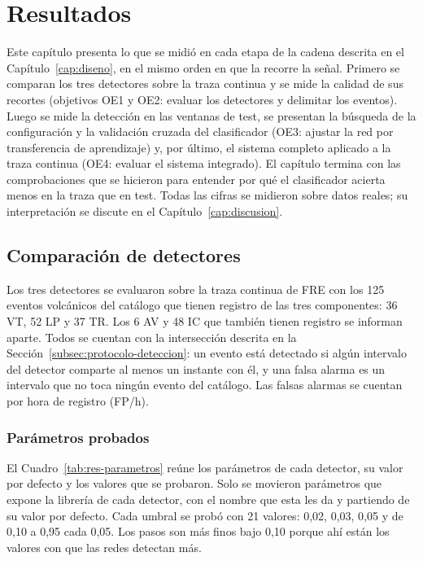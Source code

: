 \chapter{Resultados}
\label{cap:resultados}

Este capítulo presenta lo que se midió en cada etapa de la cadena descrita en
el Capítulo~\ref{cap:diseno}, en el mismo orden en que la recorre la señal.
Primero se comparan los tres detectores sobre la traza continua y se mide la
calidad de sus recortes (objetivos OE1 y OE2: evaluar los detectores y
delimitar los eventos). Luego se mide la detección en las ventanas de test, se
presentan la búsqueda de la configuración y la validación cruzada del
clasificador (OE3: ajustar la red por transferencia de aprendizaje) y, por
último, el sistema completo aplicado a la traza continua (OE4: evaluar el
sistema integrado). El capítulo termina con las comprobaciones que se hicieron
para entender por qué el clasificador acierta menos en la traza que en test.
Todas las cifras se midieron sobre datos reales; su interpretación se discute
en el Capítulo~\ref{cap:discusion}.

\section{Comparación de detectores}
\label{sec:res-detectores}

Los tres detectores se evaluaron sobre la traza continua de FRE con los 125
eventos volcánicos del catálogo que tienen registro de las tres componentes:
36 VT, 52 LP y 37 TR. Los 6 AV y 48 IC que también tienen registro se informan
aparte. Todos se cuentan con la intersección descrita en la
Sección~\ref{subsec:protocolo-deteccion}: un evento está detectado si algún
intervalo del detector comparte al menos un instante con él, y una falsa
alarma es un intervalo que no toca ningún evento del catálogo. Las falsas
alarmas se cuentan por hora de registro (FP/h).

\subsection{Parámetros probados}
\label{subsec:res-parametros}

El Cuadro~\ref{tab:res-parametros} reúne los parámetros de cada detector, su
valor por defecto y los valores que se probaron. Solo se movieron parámetros
que expone la librería de cada detector, con el nombre que esta les da y
partiendo de su valor por defecto. Cada umbral se probó con 21 valores: 0,02,
0,03, 0,05 y de 0,10 a 0,95 cada 0,05. Los pasos son más finos bajo 0,10
porque ahí están los valores con que las redes detectan más.

